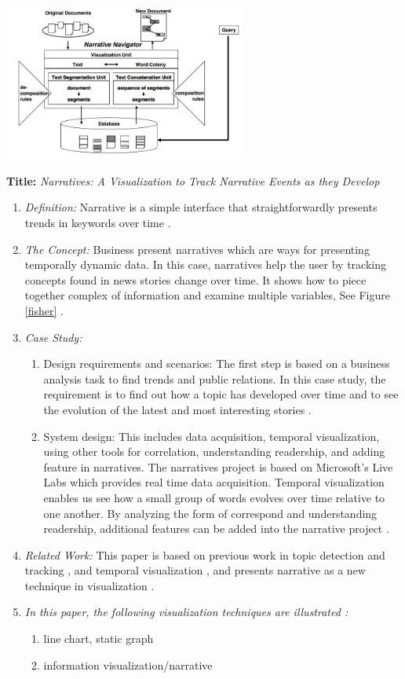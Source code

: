 \documentclass{egpubl}
\begin{document}
\begingroup
\centering
\includegraphics[width=8cm]{./images/akashi}
\label{akashi}
\endgroup


\textbf{Title:} \textit{Narratives: A Visualization to Track Narrative Events as they Develop}
\begin{enumerate}
\item \textit{Definition:} Narrative is a simple interface that straightforwardly presents trends in keywords over time \cite{fisher}.
\item \textit{The Concept:} Business present narratives which are ways for presenting temporally dynamic data. In this case, narratives help the user by tracking concepts found in news stories change over time. It shows how to piece together complex of information and examine multiple variables, See Figure \ref{fisher} \cite{fisher}.
\item \textit{Case Study:}
\begin{enumerate}
\item Design requirements and scenarios: The first step is based on a business analysis task to find trends and public relations. In this case study, the requirement is to find out how a topic has developed over time and to see the evolution of the latest and most interesting stories \cite{fisher}.
\item System design: This includes data acquisition, temporal visualization, using other tools for correlation, understanding readership, and adding feature in narratives. The narratives project is based on Microsoft's Live Labs which provides real time data acquisition. Temporal visualization enables us see how a small group of words evolves over time relative to one another. By analyzing the form of correspond and understanding readership, additional features can be added into the narrative project \cite{fisher}.
\end{enumerate}
\item \textit{Related Work:} This paper is based on previous work in topic detection and tracking\cite{dubinko2007} \cite{russell2000}, and temporal visualization \cite{van1999}, and presents narrative as a new technique in visualization \cite{fisher}.
\item \textit{In this paper, the following visualization techniques are illustrated :} 
\begin{enumerate}
\item line chart, static graph
\item information visualization/narrative
\end{enumerate}
\end{enumerate}
\end{document}
